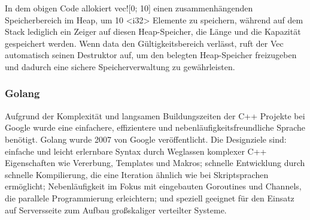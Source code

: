 \begin{figure}[htp]
    \centering
    
    \label{fig:dangling_pointer_in_Rust}
\end{figure}

\begin{figure}[htp]
    \centering
    
    \label{fig:double_free_in_Rust}
\end{figure}

In dem obigen Code allokiert vec![0; 10] einen zusammenhängenden Speicherbereich 
im Heap, um 10 <i32> Elemente zu speichern, während auf dem Stack lediglich ein 
Zeiger auf diesen Heap-Speicher, die Länge und die Kapazität gespeichert werden. 
Wenn data den Gültigkeitsbereich verlässt, ruft der Vec automatisch seinen 
Destruktor auf, um den belegten Heap-Speicher freizugeben und dadurch eine sichere 
Speicherverwaltung zu gewährleisten.

\subsubsection{Golang}
\label{sec:Golang}
Aufgrund der Komplexität und langsamen Buildungszeiten der C++ Projekte bei 
Google wurde eine einfachere, effizientere und nebenläufigkeitsfreundliche Sprache 
benötigt. Golang wurde 2007 von Google veröffentlicht. Die Designziele sind: einfache 
und leicht erlernbare Syntax durch Weglassen komplexer C++ Eigenschaften wie Vererbung, 
Templates und Makros; schnelle Entwicklung durch schnelle Kompilierung, die eine Iteration 
ähnlich wie bei Skriptsprachen ermöglicht; Nebenläufigkeit im Fokus mit eingebauten Goroutines 
und Channels, die parallele Programmierung erleichtern; und speziell geeignet für den Einsatz 
auf Serversseite zum Aufbau großskaliger verteilter Systeme.


\begin{figure}[htp]
    \centering
    
    \label{fig:dangling_pointer_in_Golang}
\end{figure}

